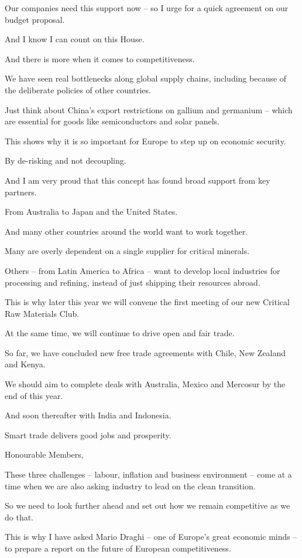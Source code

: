 \documentclass[a4paper,11pt]{article}
\begin{document}
Our companies need this support now – so I urge for a quick agreement on our budget proposal.

And I know I can count on this House. 

And there is more when it comes to competitiveness.

We have seen real bottlenecks along global supply chains, including because of the deliberate policies of other countries. 

Just think about China's export restrictions on gallium and germanium – which are essential for goods like semiconductors and solar panels.

This shows why it is so important for Europe to step up on economic security.

By de-risking and not decoupling.

And I am very proud that this concept has found broad support from key partners.

From Australia to Japan and the United States.

And many other countries around the world want to work together. 

Many are overly dependent on a single supplier for critical minerals.

Others – from Latin America to Africa – want to develop local industries for processing and refining, instead of just shipping their resources abroad.

This is why later this year we will convene the first meeting of our new Critical Raw Materials Club.

At the same time, we will continue to drive open and fair trade.

So far, we have concluded new free trade agreements with Chile, New Zealand and Kenya.

We should aim to complete deals with Australia, Mexico and Mercosur by the end of this year.

And soon thereafter with India and Indonesia.

Smart trade delivers good jobs and prosperity.

 

Honourable Members,

These three challenges – labour, inflation and business environment – come at a time when we are also asking industry to lead on the clean transition.

So we need to look further ahead and set out how we remain competitive as we do that. 

This is why I have asked Mario Draghi – one of Europe's great economic minds – to prepare a report on the future of European competitiveness.  
\end{document}
